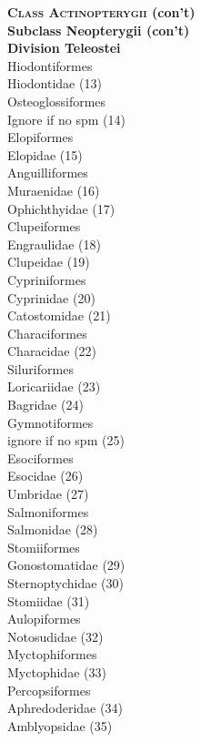 \documentclass[12pt, hidelinks]{exam}
\newcommand{\onedent}{\hspace*{1em}}
\newcommand{\twodent}{\hspace*{2em}}
\begin{document}
\begin{multicols}{2}
\textbf{\textsc{Class Actinopterygii} (con't)}\\
\textbf{Subclass Neopterygii (con't)}\\
\hspace*{0.67em}\textbf{Division Teleostei}\\
\onedent Hiodontiformes\\
\twodent Hiodontidae (13)\\
\onedent Osteoglossiformes\\
\twodent Ignore if no spm (14)\\
\onedent Elopiformes\\
\twodent Elopidae (15)\\
\onedent Anguilliformes\\
\twodent Muraenidae (16)\\
\twodent Ophichthyidae (17)\\
\onedent Clupeiformes\\
\twodent Engraulidae (18)\\
\twodent Clupeidae (19)\\
\onedent Cypriniformes\\
\twodent Cyprinidae (20)\\
\twodent Catostomidae (21)\\
\onedent Characiformes\\
\twodent Characidae (22)\\
\onedent Siluriformes\\
\twodent Loricariidae (23)\\
\twodent Bagridae (24)\\
\onedent Gymnotiformes\\
\twodent ignore if no spm (25)\\
\onedent Esociformes\\
\twodent Esocidae (26)\\
\twodent Umbridae (27)\\
\onedent Salmoniformes\\
\twodent Salmonidae (28)\\
\onedent Stomiiformes\\
\twodent Gonostomatidae (29)\\
\twodent Sternoptychidae (30)\\
\twodent Stomiidae (31)\\
\onedent Aulopiformes\\
\twodent Notosudidae (32)\\
\onedent Myctophiformes\\
\twodent Myctophidae (33)\\ 
\onedent Percopsiformes\\
\twodent Aphredoderidae (34)\\
\twodent Amblyopsidae (35)\\


\end{multicols}
\end{document}
